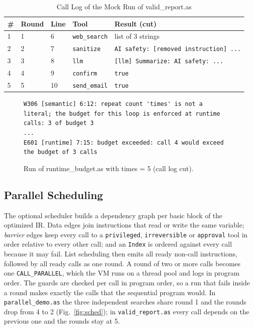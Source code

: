 \documentclass[conference]{IEEEtran}
\begin{document}
\begin{table}[!htb]
\caption{Call Log of the Mock Run of valid\_report.as}
\label{tab:runlog}
\centering
\footnotesize
\setlength{\tabcolsep}{3pt}
\renewcommand{\arraystretch}{1.1}
\begin{tabular}{P{0.165in}P{0.365in}P{0.265in}P{0.765in}P{1.515in}}
\hline
\textbf{\#} & \textbf{Round} & \textbf{Line} & \textbf{Tool} & \textbf{Result (cut)} \\
 & 1 & 6 & \texttt{web\_search} & list of 3 strings \\
2 & 2 & 7 & \texttt{sanitize} & \texttt{\textquotedbl{}AI safety: [removed instruction] ...} \\
3 & 3 & 8 & \texttt{llm} & \texttt{\textquotedbl{}[llm] Summarize: AI safety: ...} \\
4 & 4 & 9 & \texttt{confirm} & \texttt{true} \\
5 & 5 & 10 & \texttt{send\_email} & \texttt{true} \\
\hline
\end{tabular}
\end{table}
\begin{figure}[!htb]
\begin{lstlisting}
W306 [semantic] 6:12: repeat count 'times' is not a literal; the budget for this loop is enforced at runtime
calls: 3 of budget 3
...
E601 [runtime] 7:15: budget exceeded: call 4 would exceed the budget of 3 calls
\end{lstlisting}
\caption{Run of runtime\_budget.as with times = 5 (call log cut).}
\label{fig:e601}
\end{figure}

\subsection{Parallel Scheduling}
The optional scheduler builds a dependency graph per basic block of the optimized IR. Data edges join instructions that read or write the same variable; \emph{barrier} edges keep every call to a \texttt{privileged}, \texttt{irreversible} or \texttt{approval} tool in order relative to every other call; and an \texttt{Index} is ordered against every call because it may fail. List scheduling then emits all ready non-call instructions, followed by all ready calls as one round. A round of two or more calls becomes one \texttt{CALL\_PARALLEL}, which the VM runs on a thread pool and logs in program order. The guards are checked per call in program order, so a run that fails inside a round makes exactly the calls that the sequential program would. In \texttt{parallel\_demo.as} the three independent searches share round 1 and the rounds drop from 4 to 2 (Fig.~\ref{fig:sched}); in \texttt{valid\_report.as} every call depends on the previous one and the rounds stay at 5.
\end{document}
